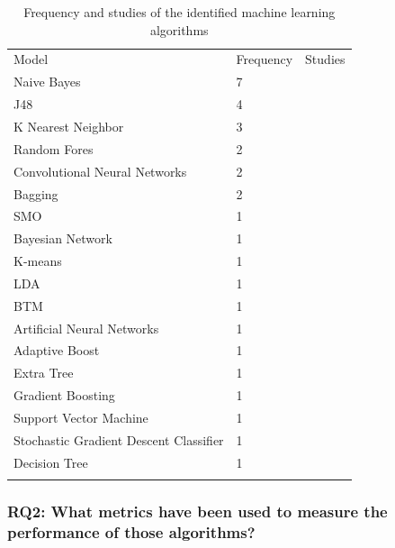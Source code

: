 \documentclass[conference]{IEEEtran}
\begin{document}
\begin{table}[!htbp]
\caption{Frequency and studies of the identified machine learning algorithms}
\label{tab:algorithms}       %
\begin{tabular}{p{3.4cm}p{1cm}p{3cm}}
\hline\noalign{\smallskip}
Model & Frequency & Studies  \\
\noalign{\smallskip}\hline\noalign{\smallskip}
Naive Bayes & 7 & \cite{6779538,8049172,8049170,Wang:2018:ACI:3239235.3267428,LI2018108,Taj:2019:ADM:3328833.3328837,Lu:2017:ACN:3084226.3084241}\\
J48 & 4 & \cite{8049172,Wang:2018:ACI:3239235.3267428,7732349,Lu:2017:ACN:3084226.3084241}\\
K Nearest Neighbor & 3 & \cite{6912260,Wang:2018:ACI:3239235.3267428,LI2018108}\\
Random Fores & 2 & \cite{6779538,8049171}\\
Convolutional Neural Networks & 2 & \cite{8754214,8049170}\\
Bagging & 2 & \cite{Wang:2018:ACI:3239235.3267428,Lu:2017:ACN:3084226.3084241}\\
SMO & 1 & \cite{6779538}\\
Bayesian Network & 1 & \cite{6779538}\\
K-means & 1 & \cite{8049172}\\
LDA & 1 & \cite{8049172}\\
BTM & 1 & \cite{8049172}\\
Artificial Neural Networks & 1 & \cite{8754214}\\
Adaptive Boost & 1 & \cite{8049171}\\
Extra Tree & 1 & \cite{8049171}\\
Gradient Boosting & 1 & \cite{8049171}\\
Support Vector Machine & 1 & \cite{LI2018108}\\
Stochastic Gradient Descent Classifier & 1 & \cite{8590177}\\
Decision Tree & 1 & \cite{Taj:2019:ADM:3328833.3328837}\\

\noalign{\smallskip}\hline
\end{tabular}
\end{table}

\subsubsection{RQ2: What metrics have been used to measure the performance of those algorithms?}
\end{document}
